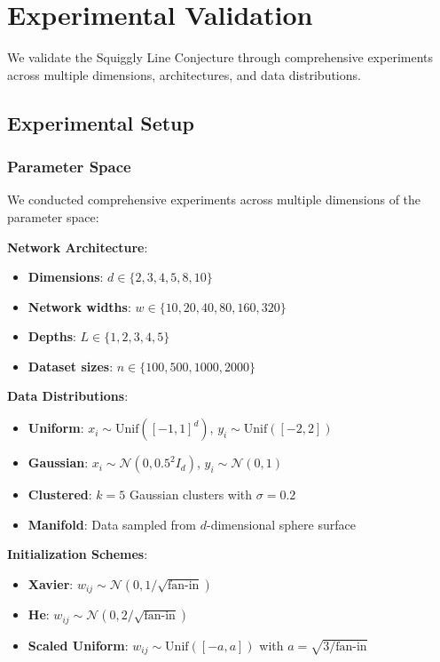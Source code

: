 \section{Experimental Validation}
\label{sec:experiments}

We validate the Squiggly Line Conjecture through comprehensive experiments across multiple dimensions, architectures, and data distributions.

\subsection{Experimental Setup}

\subsubsection{Parameter Space}

We conducted comprehensive experiments across multiple dimensions of the parameter space:

\textbf{Network Architecture}:
\begin{itemize}
    \item \textbf{Dimensions}: $d \in \{2, 3, 4, 5, 8, 10\}$
    \item \textbf{Network widths}: $w \in \{10, 20, 40, 80, 160, 320\}$
    \item \textbf{Depths}: $L \in \{1, 2, 3, 4, 5\}$
    \item \textbf{Dataset sizes}: $n \in \{100, 500, 1000, 2000\}$
\end{itemize}

\textbf{Data Distributions}:
\begin{itemize}
    \item \textbf{Uniform}: $x_i \sim \text{Unif}([-1,1]^d)$, $y_i \sim \text{Unif}([-2,2])$
    \item \textbf{Gaussian}: $x_i \sim \mathcal{N}(0, 0.5^2 I_d)$, $y_i \sim \mathcal{N}(0,1)$
    \item \textbf{Clustered}: $k=5$ Gaussian clusters with $\sigma = 0.2$
    \item \textbf{Manifold}: Data sampled from $d$-dimensional sphere surface
\end{itemize}

\textbf{Initialization Schemes}:
\begin{itemize}
    \item \textbf{Xavier}: $w_{ij} \sim \mathcal{N}(0, 1/\sqrt{\text{fan-in}})$ \cite{Glorot2010UnderstandingTD}
    \item \textbf{He}: $w_{ij} \sim \mathcal{N}(0, 2/\sqrt{\text{fan-in}})$ \cite{He2015DelvingDI}
    \item \textbf{Scaled Uniform}: $w_{ij} \sim \text{Unif}([-a, a])$ with $a = \sqrt{3/\text{fan-in}}$
\end{itemize}

